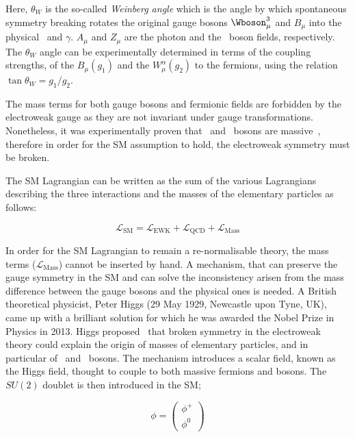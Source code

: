			\noindent Here, $\theta_W$ is the so-called \emph{Weinberg angle} which is the angle by which spontaneous symmetry breaking rotates the original gauge bosons $\Wboson_{\mu}^3$ and $B_{\mu}$ into the physical \Zboson\ and $\gamma$. $A_\mu$ and $Z_\mu$ are the photon and the \Zboson\ boson fields, respectively. The $\theta_W$ angle can be experimentally determined in terms of the coupling strengths, of the $B_{\mu}(g_1)$ and the $W_{\mu}^\alpha (g_2)$ to the fermions, using the relation $\tan\theta_W = g_1 / g_2 $. 

			The mass terms for both gauge bosons and fermionic fields are forbidden by the electroweak gauge as they are not invariant under gauge transformations. Nonetheless, it was experimentally proven that \Wboson\ and \Zboson\ bosons are massive~\cite{Pich2012}, therefore in order for the \ac{SM} assumption to hold, the electroweak symmetry must be broken. 

			The \ac{SM} Lagrangian can be written as the sum of the various Lagrangians describing the three interactions and the masses of the elementary particles as follows:

			\begin{equation}
			\label{eq:SM_Lagrangian}
				\mathcal{L_{\mathrm{SM}}} = \mathcal{L_{\mathrm{EWK}}} + \mathcal{L_{\mathrm{QCD}}} + \mathcal{L_{\mathrm{Mass}}}
			\end{equation}

			\noindent In order for the \ac{SM} Lagrangian to remain a re-normalisable theory, the mass terms ($\mathcal{L_{\mathrm{Mass}}}$) cannot be inserted by hand. A mechanism, that can preserve the gauge symmetry in the \ac{SM} and can solve the inconsistency arisen from the mass difference between the gauge bosons and the physical ones is needed. A British theoretical physicist, Peter Higgs (29 May 1929, Newcastle upon Tyne, UK), came up with a brilliant solution for which he was awarded the Nobel Prize in Physics in 2013. Higgs proposed~\cite{Higgs1964} that broken symmetry in the electroweak theory could explain the origin of masses of elementary particles, and in particular of \Wboson\ and \Zboson\ bosons. The mechanism introduces a scalar field, known as the Higgs field, thought to couple to both massive fermions and bosons. The $SU(2)$ doublet is then introduced in the \ac{SM};

			\begin{equation}
			\label{eq:Higgs_field}
				\phi = 
				\begin{pmatrix}
					\phi^+ \\ \phi^0
				\end{pmatrix} 
			\end{equation}

